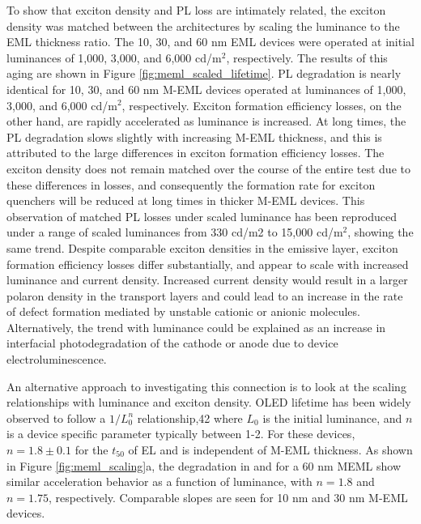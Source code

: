 \documentclass[../thesis.tex]{subfiles}
\begin{document}
To show that exciton density and PL loss are intimately related, the exciton density was matched between the architectures by scaling the luminance to the EML thickness ratio.  
The 10, 30, and 60 nm EML devices were operated at initial luminances of 1,000, 3,000, and 6,000 cd/m$^2$, respectively.
The results of this aging are shown in Figure \ref{fig:meml_scaled_lifetime}.
PL degradation is nearly identical for 10, 30, and 60 nm M-EML devices operated at luminances of 1,000, 3,000, and 6,000 cd/m$^2$, respectively. 
Exciton formation efficiency losses, on the other hand, are rapidly accelerated as luminance is increased. 
At long times, the PL degradation slows slightly with increasing M-EML thickness, and this is attributed to the large differences in exciton formation efficiency losses. 
The exciton density does not remain matched over the course of the entire test due to these differences in \ef losses, and consequently the formation rate for exciton quenchers will be reduced at long times in thicker M-EML devices. 
This observation of matched PL losses under scaled luminance has been reproduced under a range of scaled luminances from 330 cd/m2 to 15,000 cd/m$^2$, showing the same trend. 
Despite comparable exciton densities in the emissive layer, exciton formation efficiency losses differ substantially, and appear to scale with increased luminance and current density. 
Increased current density would result in a larger polaron density in the transport layers and could lead to an increase in the rate of defect formation mediated by unstable cationic or anionic molecules.
Alternatively, the trend with luminance could be explained as an increase in interfacial photodegradation of the cathode or anode due to device electroluminescence.\supercite{Wang2012,Wang2010a}



An alternative approach to investigating this connection is to look at the scaling relationships with luminance and exciton density.
OLED lifetime has been widely observed to follow a $1/L_0^n$ relationship,42 where $L_0$ is the initial luminance, and $n$ is a device specific parameter typically between 1-2. 
For these devices, $n = 1.8 \pm 0.1$ for the $t_{50}$ of EL and is independent of M-EML thickness. 
As shown in Figure \ref{fig:meml_scaling}a, the degradation in \pl and \ef for a 60 nm MEML show similar acceleration behavior as a function of luminance, with $n = 1.8$ and $n = 1.75$, respectively. 
Comparable slopes are seen for 10 nm and 30 nm M-EML devices. 
\end{document}
